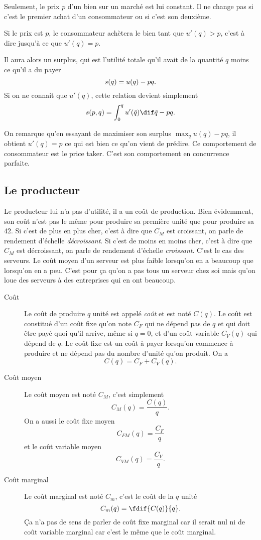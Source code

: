 Seulement, le prix $p$ d'un bien sur un marché est lui constant.
Il ne change pas si c'est le premier achat d'un consommateur ou si
c'est son deuxième.

Si le prix est $p$, le consommateur achètera le bien tant que
$u'(q) > p$, c'est à dire jusqu'à ce que $u'(q) = p$.

Il aura alors un surplus, qui est l'utilité totale qu'il avait
de la quantité $q$ moins ce qu'il a du payer
\[ s(q) = u(q) - pq. \]
Si on ne connait que $u'(q)$, cette relation devient simplement
\begin{equation}
  \label{eq:surplus_1cons}
  \surplus(p, q) = \int_0^q u'(\tilde{q})\dif \tilde{q} - pq.
\end{equation}

On remarque qu'en essayant de maximiser son surplus $\max_q u(q) - pq$,
il obtient $u'(q) = p$ ce qui est bien ce qu'on vient de prédire.
Ce comportement de consommateur est le price taker.
C'est son comportement en concurrence parfaite.

\subsection{Le producteur}
Le producteur lui n'a pas d'utilité, il a un coût de production.
Bien évidemment, son coût n'est pas le même pour produire sa première unité
que pour produire sa 42\ieme{}.
Si c'est de plus en plus cher,
c'est à dire que $C_M$ est croissant,
on parle de rendement d'échelle \emph{décroissant}.
Si c'est de moins en moins cher,
c'est à dire que $C_M$ est décroissant,
on parle de rendement d'échelle \emph{croissant}.
C'est le cas des serveurs.
Le coût moyen d'un serveur est plus faible lorsqu'on en a beaucoup que
lorsqu'on en a peu.
C'est pour ça qu'on a pas tous un serveur chez soi mais qu'on loue
des serveurs à des entreprises qui en ont beaucoup.

\begin{description}
  \item[Coût]
    Le coût de produire $q$ unité est appelé \emph{coût} et est noté $C(q)$.
    Le coût est constitué d'un coût fixe qu'on note $C_F$ qui ne dépend
    pas de $q$ et qui doit être payé quoi qu'il arrive,
    même si $q = 0$, et d'un coût
    variable $C_V(q)$ qui dépend de $q$.
    Le coût fixe est un coût à payer lorsqu'on commence à produire
    et ne dépend pas du nombre d'unité qu'on produit. On a
    \[ C(q) = C_F + C_V(q). \]
  \item[Coût moyen]
    Le coût moyen est noté $C_M$, c'est simplement
    \[ C_M(q) = \frac{C(q)}{q}. \]
    On a aussi le coût fixe moyen
    \[ C_{FM}(q) = \frac{C_F}{q} \]
    et le coût variable moyen
    \[ C_{VM}(q) = \frac{C_V}{q}. \]
  \item[Coût marginal]
    Le coût marginal est noté $C_m$, c'est le coût de la $q$\ieme{} unité
    \[ C_m(q) = \fdif{C(q)}{q}. \]
    Ça n'a pas de sens de parler de coût fixe marginal car il serait nul
    ni de coût variable marginal car c'est le même que le coût marginal.
\end{description}

